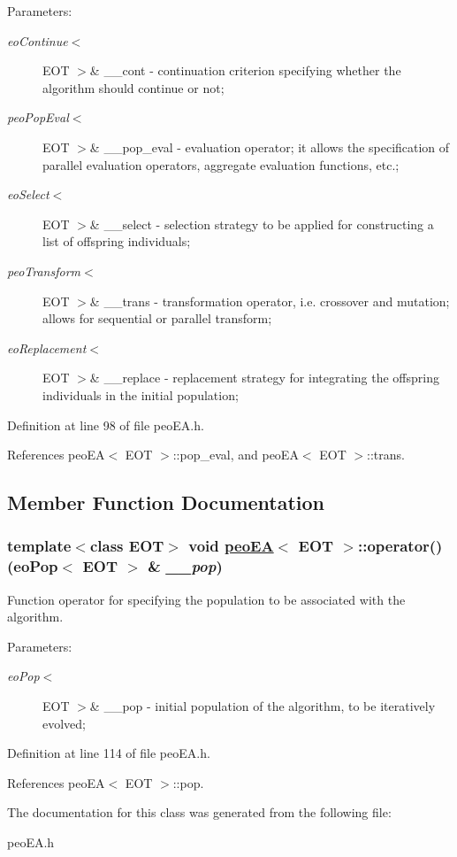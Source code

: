 \begin{Desc}
\item[Parameters:]
\begin{description}
\item[{\em eo\-Continue$<$}]EOT $>$\& \_\-\_\-cont - continuation criterion specifying whether the algorithm should continue or not; \item[{\em peo\-Pop\-Eval$<$}]EOT $>$\& \_\-\_\-pop\_\-eval - evaluation operator; it allows the specification of parallel evaluation operators, aggregate evaluation functions, etc.; \item[{\em eo\-Select$<$}]EOT $>$\& \_\-\_\-select - selection strategy to be applied for constructing a list of offspring individuals; \item[{\em peo\-Transform$<$}]EOT $>$\& \_\-\_\-trans - transformation operator, i.e. crossover and mutation; allows for sequential or parallel transform; \item[{\em eo\-Replacement$<$}]EOT $>$\& \_\-\_\-replace - replacement strategy for integrating the offspring individuals in the initial population; \end{description}
\end{Desc}


Definition at line 98 of file peo\-EA.h.

References peo\-EA$<$ EOT $>$::pop\_\-eval, and peo\-EA$<$ EOT $>$::trans.

\subsection{Member Function Documentation}
\hypertarget{classpeoEA_3c709e3b2491147d26fee36138644613}{
\subsubsection[operator()]{\setlength{\rightskip}{0pt plus 5cm}template$<$class EOT$>$ void \hyperlink{classpeoEA}{peo\-EA}$<$ EOT $>$::operator() (eo\-Pop$<$ EOT $>$ \& {\em \_\-\_\-pop})}}
\label{classpeoEA_3c709e3b2491147d26fee36138644613}


Function operator for specifying the population to be associated with the algorithm. 

\begin{Desc}
\item[Parameters:]
\begin{description}
\item[{\em eo\-Pop$<$}]EOT $>$\& \_\-\_\-pop - initial population of the algorithm, to be iteratively evolved; \end{description}
\end{Desc}


Definition at line 114 of file peo\-EA.h.

References peo\-EA$<$ EOT $>$::pop.

The documentation for this class was generated from the following file:\begin{CompactItemize}
\item 
peo\-EA.h\end{CompactItemize}
